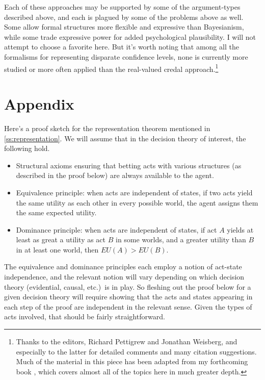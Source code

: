 Each of these approaches may be supported by some of the argument-types described above, and each is plagued by some of the problems above as well. Some allow formal structures more flexible and expressive than Bayesianism, while some trade expressive power for added psychological plausibility. I will not attempt to choose a favorite here. But it's worth noting that among all the formalisms for representing disparate confidence levels, none is currently more studied or more often applied than the real-valued credal approach.\footnote
{Thanks to the editors, Richard Pettigrew and Jonathan Weisberg, and especially to the latter for detailed comments and many citation suggestions.  Much of the material in this piece has been adapted from my forthcoming book \citep{TitelbaumFBE}, which covers almost all of the topics here in much greater depth.} 



\section{Appendix}

Here's a proof sketch for the representation theorem mentioned in \autoref{ss:representation}. We will assume that in the decision theory of interest, the following hold.
\begin{itemize}
\item Structural axioms ensuring that betting acts with various structures (as described in the proof below) are always available to the agent.
\item Equivalence principle: when acts are independent of states, if two acts yield the same utility as each other in every possible world, the agent assigns them the same expected utility.
\item Dominance principle: when acts are independent of states, if act $A$ yields at least as great a utility as act $B$ in some worlds, and a greater utility than $B$ in at least one world, then $EU(A)>EU(B)$.
\end{itemize}
The equivalence and dominance principles each employ a notion of act-state independence, and the relevant notion will vary depending on which decision theory (evidential, causal, etc.)\ is in play.  So fleshing out the proof below for a given decision theory will require showing that the acts and states appearing in each step of the proof are independent in the relevant sense. Given the types of acts involved, that should be fairly straightforward.

